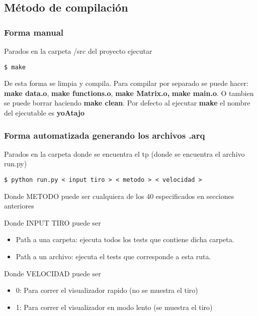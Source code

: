 \subsection{M\'etodo de compilaci\'on}
\subsubsection{Forma manual}
\begin{framed}
Parados en la carpeta /src del proyecto ejecutar 
\begin{verbatim}
$ make
\end{verbatim}
De esta forma se limpia y compila.
Para compilar por separado se puede hacer:  \textbf{make data.o}, \textbf{make functions.o}, \textbf{make Matrix.o,} \textbf{make main.o}. O tambien se puede borrar haciendo \textbf{make clean}. Por defecto al ejecutar \textbf{make} el nombre del ejecutable es \textbf{yoAtajo}
\end{framed}
\subsubsection{Forma automatizada generando los archivos \textbf{.arq}}
\begin{framed}
Parados en la carpeta donde se encuentra el tp (donde se encuentra el archivo run.py)
\begin{verbatim}
$ python run.py < input tiro > < metodo > < velocidad > 
\end{verbatim}
Donde METODO puede ser cualquiera de los 40 especificados en secciones anteriores

Donde INPUT TIRO puede ser 
\begin{itemize}
	\item Path a una carpeta: ejecuta todos los tests que contiene dicha carpeta.
	\item Path a un archivo: ejecuta el tests que corresponde a esta ruta.
\end{itemize}

Donde VELOCIDAD puede ser 
\begin{itemize}
	\item 0: Para correr el visualizador rapido (no se muestra el tiro)
	\item 1: Para correr el visualizador en modo lento (se muestra el tiro)
\end{itemize}
\end{framed}

